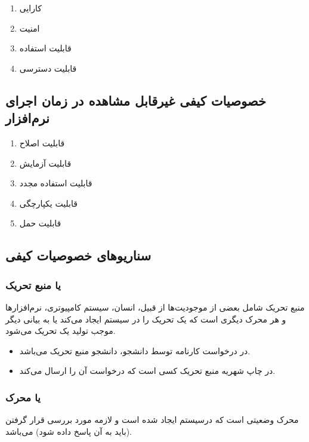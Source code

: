 \begin{enumerate}
    \item کارایی
    \item امنیت
    \item قابلیت استفاده
    \item قابلیت دسترسی
\end{enumerate}

\subsection{خصوصیات کیفی غیرقابل مشاهده در زمان اجرای نرم‌افزار}

\begin{enumerate}
    \item قابلیت اصلاح
    \item قابلیت آزمایش
    \item قابلیت استفاده مجدد
    \item قابلیت یکپارچگی
    \item قابلیت حمل
\end{enumerate}

\subsection{سناریو‌های خصوصیات کیفی}

\subsubsection{ یا منبع تحریک}

منبع تحریک شامل بعضی از موجودیت‌ها از قبیل، انسان، سیستم کامپیوتری، نرم‌افزار‌ها
و هر محرک دیگری است که یک تحریک را در سیستم ایجاد می‌کند یا به بیانی دیگر موجب
تولید یک تحریک می‌شود.

\begin{itemize}
    \item در درخواست کارنامه توسط دانشجو، دانشجو منبع تحریک می‌باشد.
    \item در چاپ شهریه منبع تحریک کسی است که درخواست آن را ارسال می‌کند.
\end{itemize}

\subsubsection{ یا محرک}

محرک وضعیتی است که درسیستم ایجاد شده است و لازمه مورد بررسی قرار گرفتن (باید به
آن پاسخ داده شود) می‌باشد.

